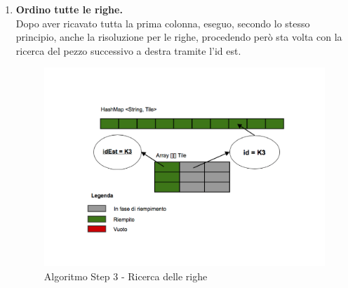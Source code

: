 \begin{enumerate}
		\item \textbf{Ordino tutte le righe.} \\
		Dopo aver ricavato tutta la prima colonna, eseguo, secondo lo stesso principio, anche la risoluzione per le righe, procedendo però sta volta con la ricerca del pezzo successivo a destra tramite l'id est.
		\begin{figure}[htbp]
			\centering
			\includegraphics[width=15cm]{img/algpuzzle_step3.pdf}
			\caption{Algoritmo Step 3 - Ricerca delle righe}
			\label{Algoritmo Step 3 - Ricerca delle righe}
		\end{figure}

	\end{enumerate}


